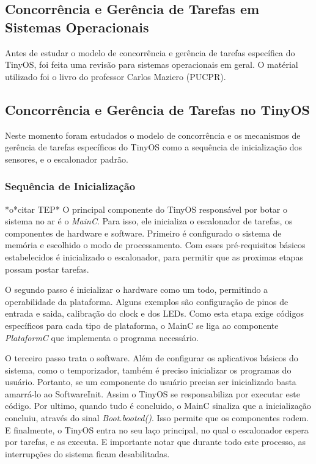\documentclass[a4paper,onecolumn, 10pt]{article}
\begin{document}
\subsection{Concorrência e Gerência de Tarefas em Sistemas Operacionais}
Antes de estudar o modelo de concorrência e gerência de tarefas específica do TinyOS, foi feita uma revisão para
sistemas operacionais em geral. O matérial utilizado foi o livro do professor Carlos Maziero (PUCPR)\cite{maziero}.

\subsection{Concorrência e Gerência de Tarefas no TinyOS}
Neste momento foram estudados o modelo de concorrência e os mecanismos de gerência de tarefas específicos do TinyOS
como a sequência de inicialização dos sensores, e o escalonador padrão.\cite{anexo1concorrenciatinyos}

\subsubsection{Sequência de Inicialização}
*o*citar TEP*
O principal componente do TinyOS responsável por botar o sistema no ar é o \textit{MainC}. Para isso, ele
inicializa o escalonador de tarefas, os componentes de hardware e software. Primeiro é configurado
o sistema de memória e escolhido o modo de processamento. Com esses pré-requisitos básicos
estabelecidos é inicializado o escalonador, para permitir que as proximas etapas possam postar
tarefas.

O segundo passo é inicializar o hardware como um todo, permitindo a operabilidade da plataforma.
Alguns exemplos são configuração de pinos de entrada e saida, calibração do clock e dos LEDs.
Como esta etapa exige códigos específicos para cada tipo de plataforma, o MainC se liga ao componente
\textit{PlataformC} que implementa o programa necessário.

O terceiro passo trata o software. Além de configurar os aplicativos básicos do sistema, como
o temporizador, também é preciso inicializar os programas do usuário. Portanto, se um componente 
do usuário precisa ser inicializado basta amarrá-lo ao SoftwareInit. Assim o TinyOS se
responsabiliza por executar este código.
Por ultimo, quando tudo é concluido, o MainC sinaliza que a inicialização concluiu, através do
sinal \textit{Boot.booted()}. Isso permite que os componentes rodem. E finalmente, o TinyOS entra no
seu laço principal, no qual o escalonador espera por tarefas, e as executa. E importante notar que
durante todo este processo, as interrupções do sistema ficam desabilitadas.
\end{document}
